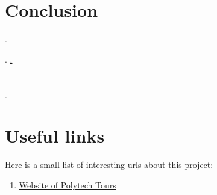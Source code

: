 \documentclass{EPUProjetDi}
\begin{document}
\chapter*{Conclusion}
\label{sec:conclusion}

.



\begin{thebibliography}{99}
\label{sec:biblio}
	. \url{.}
\end{thebibliography}


\appendix
{}



\chapter{}

.



\chapter{Useful links\label{sec:liens_utiles}}
Here is a small list of interesting urls about this project:

\begin{enumerate}
\item \href{www.polytech.univ-tours.fr}{Website of Polytech Tours}
\end{enumerate}









\makedernierepage
\end{document}
